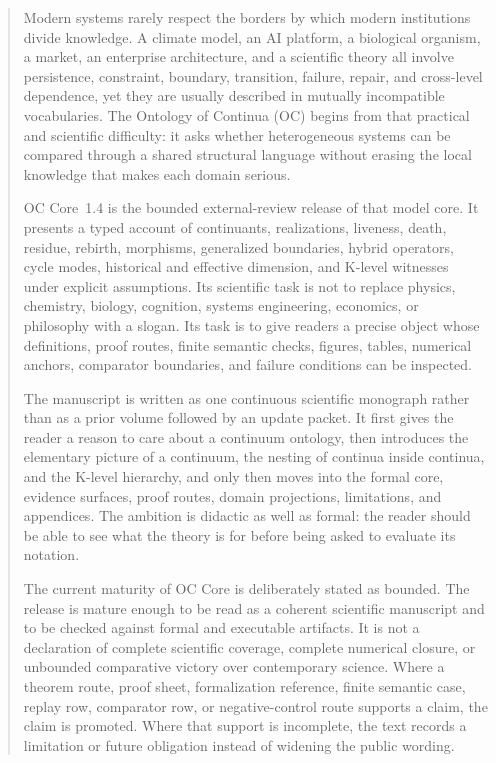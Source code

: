 \clearpage
\begin{abstract}
Modern systems rarely respect the borders by which modern institutions divide
knowledge. A climate model, an AI platform, a biological organism, a market, an
enterprise architecture, and a scientific theory all involve persistence,
constraint, boundary, transition, failure, repair, and cross-level dependence,
yet they are usually described in mutually incompatible vocabularies. The
Ontology of Continua (OC) begins from that practical and scientific difficulty:
it asks whether heterogeneous systems can be compared through a shared
structural language without erasing the local knowledge that makes each domain
serious.

OC Core~1.4 is the bounded external-review release of that model core. It
presents a typed account of continuants, realizations, liveness, death,
residue, rebirth, morphisms, generalized boundaries, hybrid operators, cycle
modes, historical and effective dimension, and K-level witnesses under explicit
assumptions. Its scientific task is not to replace physics, chemistry, biology,
cognition, systems engineering, economics, or philosophy with a slogan. Its
task is to give readers a precise object whose definitions, proof routes,
finite semantic checks, figures, tables, numerical anchors, comparator
boundaries, and failure conditions can be inspected.

The manuscript is written as one continuous scientific monograph rather than as
a prior volume followed by an update packet. It first gives the reader a reason
to care about a continuum ontology, then introduces the elementary picture of a
continuum, the nesting of continua inside continua, and the K-level hierarchy,
and only then moves into the formal core, evidence surfaces, proof routes,
domain projections, limitations, and appendices. The ambition is didactic as
well as formal: the reader should be able to see what the theory is for before
being asked to evaluate its notation.

The current maturity of OC Core is deliberately stated as bounded. The release
is mature enough to be read as a coherent scientific manuscript and to be
checked against formal and executable artifacts. It is not a declaration of
complete scientific coverage, complete numerical closure, or unbounded
comparative victory over contemporary science. Where a theorem route, proof
sheet, formalization reference, finite semantic case, replay row, comparator row, or
negative-control route supports a claim, the claim is promoted. Where that
support is incomplete, the text records a limitation or future obligation
instead of widening the public wording.


\end{abstract}

